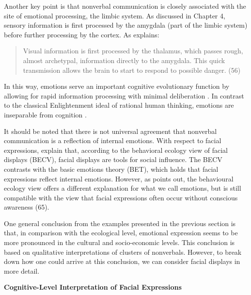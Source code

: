 Another key point is that nonverbal communication is closely associated with the site of emotional processing, the limbic system. As discussed in Chapter 4, sensory information is first processed by the amygdala (part of the limbic system) before further processing by the cortex. As \cite{LeDoux1994} explains:

\begin{quote}
Visual information is first processed by the thalamus, which passes rough, almost archetypal, information directly to the amygdala. This quick transmission allows the brain to start to respond to possible danger. (56)
\end{quote}

In this way, emotions serve an important cognitive evolutionary function by allowing for rapid information processing with minimal deliberation \citep{Tooby2008}. In contrast to the classical Enlightenment ideal of rational human thinking, emotions are inseparable from cognition \citep{Lakoff2010a}.

It should be noted that there is not universal agreement that nonverbal communication is a reflection of internal emotions. With respect to facial expressions, \cite{Crivelli2018} explain that, according to the behavioral ecology view of facial displays (BECV), facial displays are tools for social influence. The BECV contrasts with the basic emotions theory (BET), which holds that facial expressions reflect internal emotions. However, as \cite{Lakin2006} points out, the behavioural ecology view offers a different explanation for what we call emotions, but is still compatible with the view that facial expressions often occur without conscious awareness (65). 

One general conclusion from the examples presented in the previous section is that, in comparison with the ecological level, emotional expression seems to be more pronounced in the cultural and socio-economic levels. This conclusion is based on qualitative interpretations of clusters of nonverbals. However, to break down how one could arrive at this conclusion, we can consider facial displays in more detail.  

\textbf{Cognitive-Level Interpretation of Facial Expressions}


